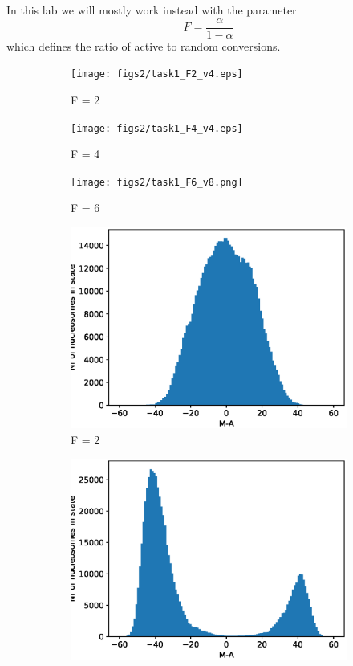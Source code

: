 \documentclass[fleqn,10pt]{SelfArx} %
\begin{document}
In this lab we will mostly work instead with the parameter 
\begin{equation}
	F = \frac{\alpha}{1-\alpha}
	\label{eq:F}
\end{equation}
which defines the ratio of active to random conversions. 

\begin{figure}[ht]
	\centering
	\begin{subfigure}[b]{.3\textwidth}
		\centering
		\texttt{[image: figs2/task1\_F2\_v4.eps]}
		\caption{F = 2}
		\label{fig:task1_F2}
	\end{subfigure}
	\begin{subfigure}[b]{.3\textwidth}
		\centering
		\texttt{[image: figs2/task1\_F4\_v4.eps]}
		\caption{F = 4}
		\label{fig:task1_F4}
	\end{subfigure}
	\begin{subfigure}[b]{.3\textwidth}
		\centering
		\texttt{[image: figs2/task1\_F6\_v8.png]}
		\caption{F = 6}
		\label{fig:task1_F6}
	\end{subfigure}
	\begin{subfigure}[b]{.3\textwidth}
		\centering
		\includegraphics[width= \linewidth]{figs2/task1_F2_hist_v4.eps}
		\caption{F = 2}
		\label{fig:task1_F2_hist}
	\end{subfigure}
	\begin{subfigure}[b]{.3\textwidth}
		\centering
		\includegraphics[width= \linewidth]{figs2/task1_F4_hist_v4.eps}

\end{subfigure}
\end{figure}
\end{document}
